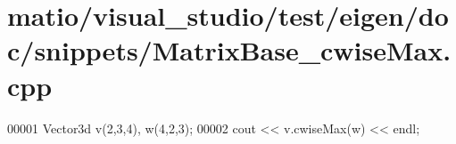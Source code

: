 \hypertarget{matio_2visual__studio_2test_2eigen_2doc_2snippets_2_matrix_base__cwise_max_8cpp_source}{}\section{matio/visual\+\_\+studio/test/eigen/doc/snippets/\+Matrix\+Base\+\_\+cwise\+Max.cpp}
\label{matio_2visual__studio_2test_2eigen_2doc_2snippets_2_matrix_base__cwise_max_8cpp_source}

\begin{DoxyCode}
00001 Vector3d v(2,3,4), w(4,2,3);
00002 cout << v.cwiseMax(w) << endl;
\end{DoxyCode}
